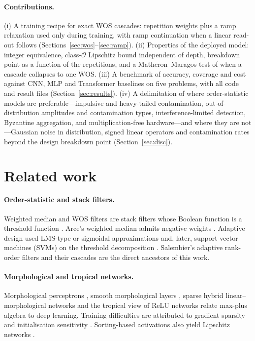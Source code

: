 \documentclass[11pt,a4paper]{article}
\theoremstyle{definition}
\theoremstyle{remark}
\begin{document}
\paragraph{Contributions.}
(i) A training recipe for exact WOS cascades: repetition weights plus a ramp relaxation used only during training, with
ramp continuation when a linear read-out follows (Sections~\ref{sec:wos}--\ref{sec:ramp}).
(ii) Properties of the deployed model: integer equivalence, class-$\mathcal O$ Lipschitz bound independent of depth,
breakdown point as a function of the repetitions, and a Matheron--Maragos test of when a cascade collapses to one WOS.
(iii) A benchmark of accuracy, coverage and cost against CNN, MLP and Transformer baselines on five problems, with all
code and result files (Section~\ref{sec:results}).
(iv) A delimitation of where order-statistic models are preferable---impulsive and heavy-tailed contamination,
out-of-distribution amplitudes and contamination types, interference-limited detection, Byzantine aggregation, and
multiplication-free hardware---and where they are not---Gaussian noise in distribution, signed linear operators and
contamination rates beyond the design breakdown point (Section~\ref{sec:disc}).

\section{Related work}
\paragraph{Order-statistic and stack filters.} Weighted median and WOS filters \cite{brownrigg1984,yin1996} are stack
filters \cite{wendt1986stack} whose Boolean function is a threshold function \cite{yliharja1991}. Arce's weighted
median admits negative weights \cite{arce1998}. Adaptive design used LMS-type or sigmoidal approximations
\cite{salembier1992,pitas1991,ropert1994,yin1996} and, later, support vector machines (SVMs) on the threshold decomposition \cite{yao2006}.
Salembier's adaptive rank-order filters \cite{salembier1992} and their cascades \cite{delrio1993} are the direct
ancestors of this work.
\paragraph{Morphological and tropical networks.} Morphological perceptrons \cite{ritter1996,charisopoulos2017}, smooth
morphological layers \cite{hermary2022}, sparse hybrid linear--morphological networks \cite{fotopoulos2025} and the tropical
view of ReLU networks \cite{zhang2018tropical} relate max-plus algebra to deep learning. Training difficulties are
attributed to gradient sparsity and initialisation sensitivity \cite{dimitrova2026}. Sorting-based activations also
yield Lipschitz networks \cite{anil2019}.
\end{document}
